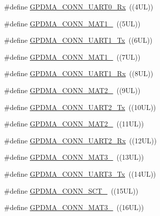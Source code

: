 \begin{DoxyCompactItemize}
\#define \hyperlink{group___g_p_d_m_a__18_x_x__43_x_x_ga2cb76be0ac39a2b019135810039376aa}{G\+P\+D\+M\+A\+\_\+\+C\+O\+N\+N\+\_\+\+U\+A\+R\+T0\+\_\+\+Rx}~((4\+U\+L))
\item 
\#define \hyperlink{group___g_p_d_m_a__18_x_x__43_x_x_gac6c7b9c39c1a03eb71f1f869b995cb1c}{G\+P\+D\+M\+A\+\_\+\+C\+O\+N\+N\+\_\+\+M\+A\+T1\+\_}~((5\+U\+L))
\item 
\#define \hyperlink{group___g_p_d_m_a__18_x_x__43_x_x_gaea5294ba355bbe1efed07d65718c7e83}{G\+P\+D\+M\+A\+\_\+\+C\+O\+N\+N\+\_\+\+U\+A\+R\+T1\+\_\+\+Tx}~((6\+U\+L))
\item 
\#define \hyperlink{group___g_p_d_m_a__18_x_x__43_x_x_gaf0a360f1cd012b454bd28d89893e2121}{G\+P\+D\+M\+A\+\_\+\+C\+O\+N\+N\+\_\+\+M\+A\+T1\+\_}~((7\+U\+L))
\item 
\#define \hyperlink{group___g_p_d_m_a__18_x_x__43_x_x_gaf0eea043e066244910dbe7608de732b5}{G\+P\+D\+M\+A\+\_\+\+C\+O\+N\+N\+\_\+\+U\+A\+R\+T1\+\_\+\+Rx}~((8\+U\+L))
\item 
\#define \hyperlink{group___g_p_d_m_a__18_x_x__43_x_x_ga72ce3c7080bb473643f64f00ca6d0d37}{G\+P\+D\+M\+A\+\_\+\+C\+O\+N\+N\+\_\+\+M\+A\+T2\+\_}~((9\+U\+L))
\item 
\#define \hyperlink{group___g_p_d_m_a__18_x_x__43_x_x_ga884e268ae363efcde9c3d5e791145cb1}{G\+P\+D\+M\+A\+\_\+\+C\+O\+N\+N\+\_\+\+U\+A\+R\+T2\+\_\+\+Tx}~((10\+U\+L))
\item 
\#define \hyperlink{group___g_p_d_m_a__18_x_x__43_x_x_ga1fc900a69aeaf2ddadd72214650acc04}{G\+P\+D\+M\+A\+\_\+\+C\+O\+N\+N\+\_\+\+M\+A\+T2\+\_}~((11\+U\+L))
\item 
\#define \hyperlink{group___g_p_d_m_a__18_x_x__43_x_x_gacdfdf222b40acd9c57260c7b493cc3b5}{G\+P\+D\+M\+A\+\_\+\+C\+O\+N\+N\+\_\+\+U\+A\+R\+T2\+\_\+\+Rx}~((12\+U\+L))
\item 
\#define \hyperlink{group___g_p_d_m_a__18_x_x__43_x_x_ga15edb7c54b8ea2d2c8b0c2f762cc0ba6}{G\+P\+D\+M\+A\+\_\+\+C\+O\+N\+N\+\_\+\+M\+A\+T3\+\_}~((13\+U\+L))
\item 
\#define \hyperlink{group___g_p_d_m_a__18_x_x__43_x_x_gab3d5bed081680418d665767b721bcc75}{G\+P\+D\+M\+A\+\_\+\+C\+O\+N\+N\+\_\+\+U\+A\+R\+T3\+\_\+\+Tx}~((14\+U\+L))
\item 
\#define \hyperlink{group___g_p_d_m_a__18_x_x__43_x_x_ga12c736f56f0c09fdef50a6d177692158}{G\+P\+D\+M\+A\+\_\+\+C\+O\+N\+N\+\_\+\+S\+C\+T\+\_}~((15\+U\+L))
\item 
\#define \hyperlink{group___g_p_d_m_a__18_x_x__43_x_x_ga222eda98e258b4b4f8ff61d5aa777276}{G\+P\+D\+M\+A\+\_\+\+C\+O\+N\+N\+\_\+\+M\+A\+T3\+\_}~((16\+U\+L))

\end{DoxyCompactItemize}
